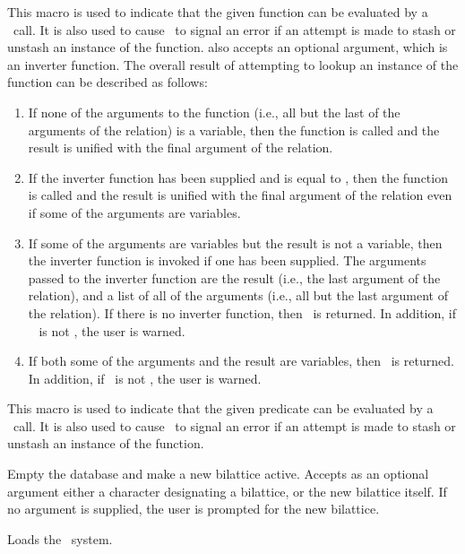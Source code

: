 \begin{list}{}{\setlength{\labelwidth}{1.5in}\setlength{\labelsep}{.25in}
\setlength{\leftmargin}{1.75in}}
\item [\itype{lisp-defined(fn)}] This macro is used to indicate that
the given function can be evaluated by a \lisp\ call.  It is also
used to cause \mvl\ to signal an error if an attempt is made to stash
or unstash an instance of the function.   also
accepts an optional argument, which is an inverter function.  The
overall result of attempting to lookup an instance of the function
can be described as follows:
 \begin{enumerate}
 \item If none of the arguments to the function (i.e., all but the
last of the arguments of the relation) is a variable, then the function
is called and the result is unified with the final argument of the
relation.
 \item If the inverter function has been supplied and is equal to \T,
then the function is called and the result is unified with the final
argument of the relation even if some of the arguments are variables.
 \item If some of the arguments are variables but the result is not a
variable, then the inverter function is invoked if one has been
supplied.  The arguments passed to the inverter function are the
result (i.e., the last argument of the relation), and a list of all
of the arguments (i.e., all but the last argument of the relation).
If there is no inverter function, then \NIL\ is returned.  In
addition, if \wbli\  is not
\NIL, the user is warned.
 \item If both some of the arguments and the result are variables, then
\NIL\ is returned.  In addition, if \wbli\ is not \NIL, the user is
warned.
 \end{enumerate}

\item [\itype{lisp-predicate(pred)}] This macro is used to indicate
that the given predicate can be evaluated by a \lisp\ call.  It is
also used to cause \mvl\ to signal an error if an attempt is made to
stash or unstash an instance of the function.

\item [\itype{load-logic}] Empty the database and make a new bilattice
active.  Accepts as an optional argument either a character designating
a bilattice, or the new bilattice itself.  If no argument is supplied,
the user is prompted for the new bilattice.

\item [\itype{load-mvl}] Loads the \mvl\ system.


\end{list}
